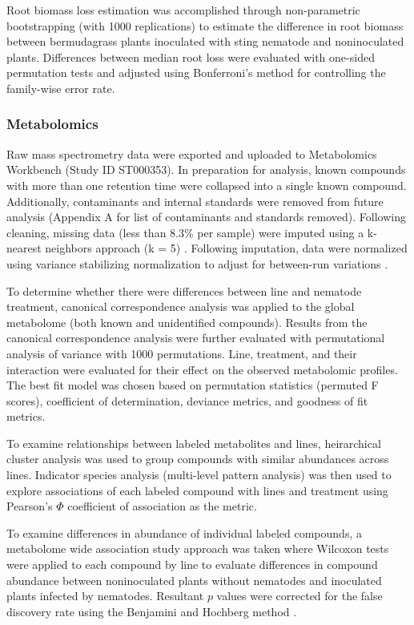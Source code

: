 \documentclass[fleqn,10pt]{wlscirep}
\begin{document}
Root biomass loss estimation was accomplished through non-parametric bootstrapping (with 1000 replications) to estimate the difference in root biomass between bermudagrass plants inoculated with sting nematode and noninoculated plants.  Differences between median root loss were evaluated with one-sided permutation tests and adjusted using Bonferroni's method for controlling the family-wise error rate.


\subsubsection*{Metabolomics}

Raw mass spectrometry data were exported and uploaded to Metabolomics Workbench (Study ID ST000353).  In preparation for analysis, known compounds with more than one retention time were collapsed into a single known compound.  Additionally, contaminants and internal standards were removed from future analysis (Appendix A for list of contaminants and standards removed).  Following cleaning, missing data (less than 8.3\% per sample) were imputed using a k-nearest neighbors approach (k = 5) \cite{armitage2015missing}.  Following imputation, data were normalized using variance stabilizing normalization to adjust for between-run variations \cite{li2016performance}.  

To determine whether there were differences between line and nematode treatment, canonical correspondence analysis was applied to the global metabolome (both known and unidentified compounds).  Results from the canonical correspondence analysis were further evaluated with permutational analysis of variance with 1000 permutations. Line, treatment, and their interaction were evaluated for their effect on the observed metabolomic profiles.  The best fit model was chosen based on permutation statistics (permuted F scores), coefficient of determination, deviance metrics, and goodness of fit metrics.  

To examine relationships between labeled metabolites and lines, heirarchical cluster analysis was used to group compounds with similar abundances across lines.  Indicator species analysis (multi-level pattern analysis) was then used to explore associations of each labeled compound with lines and treatment using Pearson's $\Phi$ coefficient of association as the metric. 

To examine differences in abundance of individual labeled compounds, a metabolome wide association study approach was taken where Wilcoxon tests were applied to each compound by line to evaluate differences in compound abundance between noninoculated plants without nematodes and inoculated plants infected by nematodes.  Resultant $p$ values were corrected for the false discovery rate using the Benjamini and Hochberg method \cite{benjamini1995controlling}.  
\end{document}
